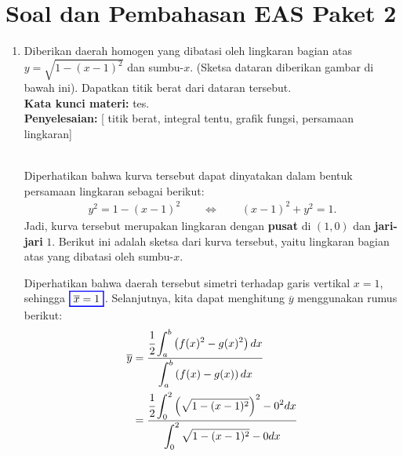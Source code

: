 \documentclass[10pt,openany,a4paper]{article}
\theoremstyle{definition}
\theoremstyle{definition}
\theoremstyle{plain}
\newenvironment{jawab}[2][tes]{
\textbf{Kata kunci materi:} #1.\\
\textbf{Penyelesaian:} #2
}{}
\begin{document}
\section*{Soal dan Pembahasan EAS Paket 2}
        \begin{enumerate}
            \item Diberikan daerah homogen yang dibatasi oleh lingkaran bagian atas $y=\sqrt{1-(x-1)^2}$ dan sumbu-$x$. (Sketsa dataran diberikan gambar di bawah ini). Dapatkan titik berat dari dataran tersebut.\\
            \begin{jawab}
                [titik berat, integral tentu, grafik fungsi, persamaan lingkaran]{\\
                    Diperhatikan bahwa kurva tersebut dapat dinyatakan dalam bentuk persamaan lingkaran sebagai berikut:
\begin{align*}
y^2 = 1 - (x-1)^2 \qquad \Longleftrightarrow \qquad (x-1)^2 + y^2 = 1.
\end{align*}
Jadi, kurva tersebut merupakan lingkaran dengan \textbf{pusat} di $(1, 0)$ dan \textbf{jari-jari} $1$. Berikut ini adalah sketsa dari kurva tersebut, yaitu lingkaran bagian atas yang dibatasi oleh sumbu-$x$.
    \begin{center}
    \end{center}
Diperhatikan bahwa daerah tersebut simetri terhadap garis vertikal $x=1$, sehingga $\colorlet{oldcolor}{.}
        \color{blue}
        \setlength{\fboxrule}{1pt} \boxed{\color{oldcolor}\overline{x}=1}\color{oldcolor}$. Selanjutnya, kita dapat menghitung $\overline{y}$ menggunakan rumus berikut:
\begin{align*}
\overline{y} &= \frac{\cfrac{1}{2}\displaystyle\int_{a}^{b} \left(f(x)^2 - g(x)^2\right) dx}{\displaystyle\int_{a}^{b} \left(f(x) - g(x)\right) dx}\\
&= \frac{\cfrac{1}{2}\displaystyle\int_{0}^{2} \left(\sqrt{1-(x-1)^2}\right)^2 - 0^2 dx}{\displaystyle\int_{0}^{2} \sqrt{1-(x-1)^2} - 0 dx}\\

\end{align*}}
\end{jawab}
\end{enumerate}
\end{document}
